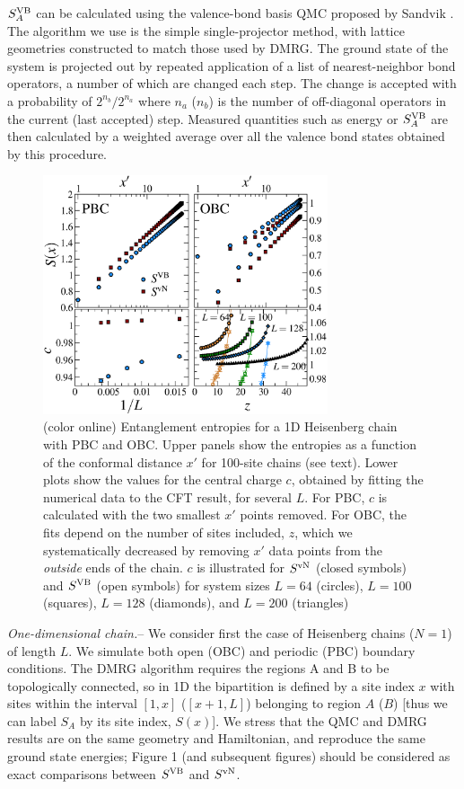 \documentclass[prl,aps,twocolumn,floatfix,amsmath,amssymb,superscriptaddress,tightenlines]{revtex4}
\begin{document}
$S^{\rm VB}_A$ \cite{Alet,Chh} 
can be calculated using the valence-bond basis
QMC proposed by Sandvik \cite{Sandvik}.  The 
algorithm we use is the simple single-projector method, with lattice
geometries constructed to match those used by DMRG.
The
ground state of the system is projected out by repeated application of a
list of nearest-neighbor bond operators,
a number
of which are changed each step.  The change is accepted
with a probability of $2^{n_{b}}/2^{n_{a}} $ where $n_{a}$ ($n_{b}$)
is the number of off-diagonal operators in the current (last accepted) step.
Measured quantities such as energy or $S^{\rm VB}_A$ are then calculated 
by a weighted average over all the valence bond
states obtained by this procedure.

\begin{figure} {
\includegraphics[width=3.3in]{4-panelFIG1.eps} \caption{(color online) 
Entanglement entropies for a 1D Heisenberg chain with PBC and OBC. Upper
panels show the entropies as a function of the conformal distance $x'$ for
100-site chains (see text).  Lower plots show the values for the central
charge $c$, obtained by fitting the numerical data to the CFT result, for
several $L$.  For PBC, $c$ is calculated with the two smallest $x'$ points
removed.  For OBC, the fits depend on the number of sites included, $z$,
which we systematically decreased by removing $x'$ data points from the
{\it outside} ends of the chain.  $c$ is illustrated for $S^{\rm vN}$
(closed symbols) and $S^{\rm VB}$ (open symbols) for system sizes $L=64$
(circles), $L=100$ (squares), $L=128$ (diamonds), and $L=200$ (triangles)
\label{1D}}} \end{figure}

{\it One-dimensional chain.}-- We consider first the case of Heisenberg
chains ($N=1$) of length $L$. We simulate both open (OBC) and periodic
(PBC) boundary conditions.  The DMRG algorithm requires the regions A and
B to be topologically connected, so in 1D the bipartition is defined by a
site index $x$ with sites within the interval $[1,x]$ ($[x+1,L]$)
belonging to region $A$ ($B$) [thus we can label $S_A$ by its site index,
$S(x)$].  We stress that the QMC and DMRG results are on the same geometry
and Hamiltonian, and reproduce the same ground state energies; Figure 1
(and subsequent figures) should 
be considered as exact comparisons between
$S^{\rm VB}$ and $S^{ \rm vN}$.
\end{document}
